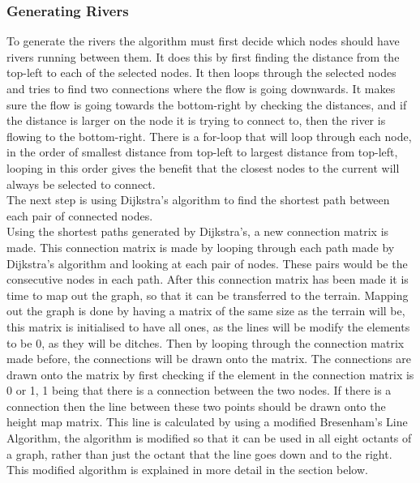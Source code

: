 \subsubsection{Generating Rivers}
	To generate the rivers the algorithm must first decide which nodes should have rivers running between them. It does this by first finding the distance from the top-left to each of the selected nodes. It then loops through the selected nodes and tries to find two connections where the flow is going downwards. It makes sure the flow is going towards the bottom-right by checking the distances, and if the distance is larger on the node it is trying to connect to, then the river is flowing to the bottom-right. There is a for-loop that will loop through each node, in the order of smallest distance from top-left to largest distance from top-left, looping in this order gives the benefit that the closest nodes to the current will always be selected to connect.\\


	The next step is using Dijkstra's algorithm to find the shortest path between each pair of connected nodes.\\


	Using the shortest paths generated by Dijkstra's, a new connection matrix is made. This connection matrix is made by looping through each path made by Dijkstra's algorithm and looking at each pair of nodes. These pairs would be the consecutive nodes in each path. After this connection matrix has been made it is time to map out the graph, so that it can be transferred to the terrain. Mapping out the graph is done by having a matrix of the same size as the terrain will be, this matrix is initialised to have all ones, as the lines will be modify the elements to be 0, as they will be ditches. Then by looping through the connection matrix made before, the connections will be drawn onto the matrix. The connections are drawn onto the matrix by first checking if the element in the connection matrix is 0 or 1, 1 being that there is a connection between the two nodes. If there is a connection then the line between these two points should be drawn onto the height map matrix. This line is calculated by using a modified Bresenham's Line Algorithm, the algorithm is modified so that it can be used in all eight octants of a graph, rather than just the octant that the line goes down and to the right. This modified algorithm is explained in more detail in the section below.

